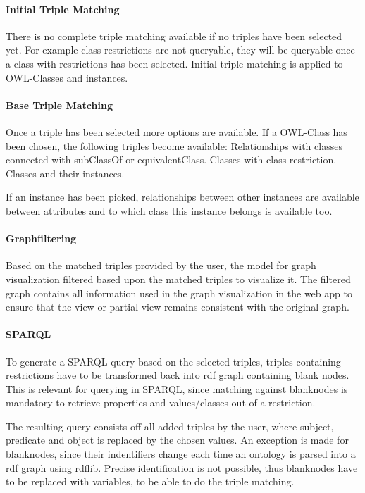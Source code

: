 \paragraph{Initial Triple Matching}
There is no complete triple matching available if no triples have been selected yet. For example class restrictions are not queryable, they will be queryable once a class
with restrictions has been selected. Initial triple matching is applied to OWL-Classes and instances.

\paragraph{Base Triple Matching} 
Once a triple has been selected more options are available. 
If a OWL-Class has been chosen, the following triples become available:
Relationships with classes connected with subClassOf or equivalentClass.
Classes with class restriction. 
Classes and their instances. 

If an instance has been picked, relationships between other instances are available
between attributes and to which class this instance belongs is available too.

\paragraph{Graphfiltering}
Based on the matched triples provided by the user, the model for graph visualization filtered based upon 
the matched triples to visualize it. The filtered graph contains all information used in the graph visualization in 
the web app to ensure that the view or partial view remains consistent with the original graph.

\paragraph{SPARQL}
To generate a SPARQL query based on the selected triples, triples containing restrictions have to be transformed back into 
rdf graph containing blank nodes. This is relevant for querying in SPARQL, since matching against blanknodes is mandatory to retrieve 
properties and values/classes out of a restriction. 

The resulting query consists off all added triples by the user, where subject, predicate and object is replaced by the 
chosen values. An exception is made for blanknodes, since their indentifiers change each time an ontology is parsed into 
a rdf graph using rdflib. Precise identification is not possible, thus blanknodes have to be replaced with variables, to 
be able to do the triple matching.







